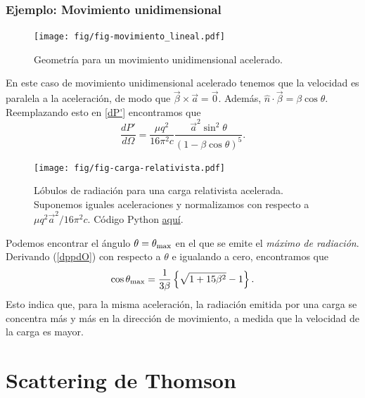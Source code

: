 \subsubsection{Ejemplo: Movimiento unidimensional}
\begin{figure}[!h]
\centerline{\texttt{[image: fig/fig-movimiento\_lineal.pdf]}}
\caption{Geometría para un movimiento unidimensional acelerado.}
\label{R14}
\end{figure}
En este caso de movimiento unidimensional acelerado tenemos que la velocidad es paralela a la aceleración, de modo que $\vec{\beta}\times\vec{a}=\vec{0}$. Además,
$\hat{n}\cdot\vec{\beta}=\beta\cos\theta$.
Reemplazando esto en \eqref{dP'} encontramos que 
\begin{equation}
\frac{dP'}{d\Omega}=\frac{\mu q^2}{16\pi^2 c}\frac{\vec{a}^2\sin^2
\theta}{\left(1-\beta\cos\theta\right)^5}. \label{dppdO}
\end{equation}
\begin{figure}[H]
\centerline{\texttt{[image: fig/fig-carga-relativista.pdf]}}
\caption{Lóbulos de radiación para una carga relativista acelerada. Suponemos
iguales aceleraciones y normalizamos con respecto a ${\mu q^2\vec{a}^2}/{16\pi^2 c}$. Código Python \href{https://github.com/gfrubi/electrodinamica/blob/master/figuras-editables/fig-carga-relativista.py}{aquí}.}
\label{lobulo02}
\end{figure}
Podemos encontrar el ángulo $\theta=\theta_{\rm max}$ en el que se emite el
\textit{máximo de radiación}. Derivando (\ref{dppdO}) con respecto a $\theta$ e
igualando a cero, encontramos que
\begin{equation}
\cos\theta_{\rm max}=\frac{1}{3\beta}\left\{  \sqrt{1+15\beta^2}-1\right\}  .
\end{equation}
Esto indica que, para la misma aceleración, la radiación emitida por una carga se concentra más y más en la dirección de movimiento, a medida que la velocidad de la carga es mayor.


\section{Scattering de Thomson}



